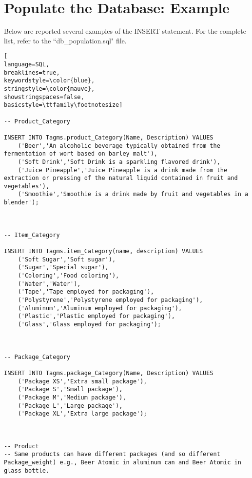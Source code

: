 
\section{Populate the Database: Example}
Below are reported several examples of the INSERT statement. For the complete list, refer to the ``db\_population.sql" file.


\begin{lstlisting}[
language=SQL,
breaklines=true,
keywordstyle=\color{blue},
stringstyle=\color{mauve},
showstringspaces=false,
basicstyle=\ttfamily\footnotesize]

-- Product_Category

INSERT INTO Tagms.product_Category(Name, Description) VALUES
    ('Beer','An alcoholic beverage typically obtained from the fermentation of wort based on barley malt'),
    ('Soft Drink','Soft Drink is a sparkling flavored drink'),
    ('Juice Pineapple','Juice Pineapple is a drink made from the extraction or pressing of the natural liquid contained in fruit and vegetables'),
    ('Smoothie','Smoothie is a drink made by fruit and vegetables in a blender');



-- Item_Category

INSERT INTO Tagms.item_Category(name, description) VALUES
    ('Soft Sugar','Soft sugar'),
    ('Sugar','Special sugar'),
    ('Coloring','Food coloring'),
    ('Water','Water'),
    ('Tape','Tape employed for packaging'),
    ('Polystyrene','Polystyrene employed for packaging'),
    ('Aluminum','Aluminum employed for packaging'),
    ('Plastic','Plastic employed for packaging'),
    ('Glass','Glass employed for packaging');



-- Package_Category

INSERT INTO Tagms.package_Category(Name, Description) VALUES
    ('Package XS','Extra small package'),
    ('Package S','Small package'),
    ('Package M','Medium package'),
    ('Package L','Large package'),
    ('Package XL','Extra large package');



-- Product
-- Same products can have different packages (and so different Package_weight) e.g., Beer Atomic in aluminum can and Beer Atomic in glass bottle.


\end{lstlisting}
